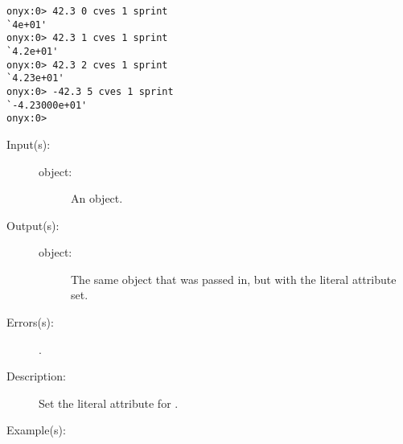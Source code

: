 \begin{description}
\begin{description}
\begin{verbatim}
onyx:0> 42.3 0 cves 1 sprint
`4e+01'
onyx:0> 42.3 1 cves 1 sprint
`4.2e+01'
onyx:0> 42.3 2 cves 1 sprint
`4.23e+01'
onyx:0> -42.3 5 cves 1 sprint
`-4.23000e+01'
onyx:0>
		\end{verbatim}
	\end{description}
\label{systemdict:cvlit}
\item[{\onyxop{object}{cvlit}{object}}: ]
	\begin{description}\item[]
	\item[Input(s): ]
		\begin{description}\item[]
		\item[object: ]
			An object.
		\end{description}
	\item[Output(s): ]
		\begin{description}\item[]
		\item[object: ]
			The same object that was passed in, but with the literal
			attribute set.
		\end{description}
	\item[Errors(s): ]
		\begin{description}\item[]
		\item[.]
		\end{description}
	\item[Description: ]
		Set the literal attribute for .
	\item[Example(s): ]\begin{verbatim}


\end{verbatim}
\end{description}
\end{description}
